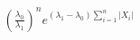 \documentclass[preview]{standalone}
\begin{document}
\begin{align*}
\left(\frac{\lambda_0}{\lambda_1}\right)^n e^{(\lambda_1-\lambda_0)\sum_{i=1}^n |X_i|}
\end{align*}
\end{document}
